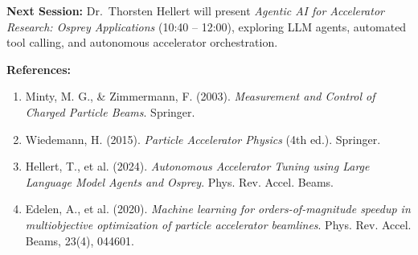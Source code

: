 \documentclass[11pt,a4paper]{article}
\begin{document}
\textbf{Next Session:} Dr.~Thorsten Hellert will present \textit{Agentic AI for Accelerator Research: Osprey Applications} (10:40 -- 12:00), exploring LLM agents, automated tool calling, and autonomous accelerator orchestration.

\vspace{1.5em}
\noindent\textbf{References:}
\begin{small}
\begin{enumerate}
    \item Minty, M. G., \& Zimmermann, F. (2003). \textit{Measurement and Control of Charged Particle Beams}. Springer.
    \item Wiedemann, H. (2015). \textit{Particle Accelerator Physics} (4th ed.). Springer.
    \item Hellert, T., et al. (2024). \textit{Autonomous Accelerator Tuning using Large Language Model Agents and Osprey}. Phys. Rev. Accel. Beams.
    \item Edelen, A., et al. (2020). \textit{Machine learning for orders-of-magnitude speedup in multiobjective optimization of particle accelerator beamlines}. Phys. Rev. Accel. Beams, 23(4), 044601.
\end{enumerate}
\end{small}
\end{document}
